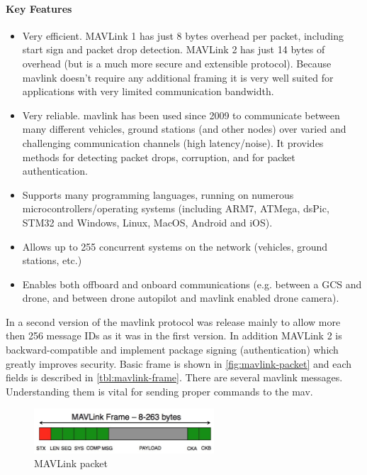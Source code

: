 \paragraph{Key Features} %
\label{par:key_features}
\begin{itemize}
	\item Very efficient. MAVLink 1 has just 8 bytes overhead per packet, including start sign and packet drop detection. MAVLink 2 has just 14 bytes of overhead (but is a much more secure and extensible protocol). Because \acrshort{mavlink} doesn't require any additional framing it is very well suited for applications with very limited communication bandwidth. 
	\item Very reliable. \acrshort{mavlink} has been used since 2009 to communicate between many different vehicles, ground stations (and other nodes) over varied and challenging communication channels (high latency/noise). It provides methods for detecting packet drops, corruption, and for packet authentication.
	\item Supports many programming languages, running on numerous microcontrollers/operating systems (including ARM7, ATMega, dsPic, STM32 and Windows, Linux, MacOS, Android and iOS).
	\item Allows up to 255 concurrent systems on the network (vehicles, ground stations, etc.)
	\item Enables both offboard and onboard communications (e.g. between a GCS and drone, and between drone autopilot and \acrshort{mavlink} enabled drone camera).
\end{itemize}
In  a second version of the \acrshort{mavlink} protocol was release mainly to allow more then 256 message IDs as it was in the first version. In addition MAVLink 2 is backward-compatible and implement package signing (authentication) which greatly improves security. Basic frame is shown in \autoref{fig:mavlink-packet} and each fields is described in \autoref{tbl:mavlink-frame}. There are several \acrshort{mavlink} messages. Understanding them is vital for sending proper commands to the mav.
\begin{figure}[ht]
    \centering
    \includegraphics[width=0.6\textwidth]{figures/A3/MAVLink-frame.png}
    \caption{MAVLink packet \cite{MavlinkSerialization}}
    \label{fig:mavlink-packet}
\end{figure}

